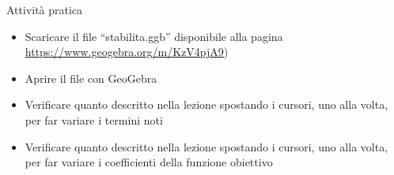 \documentclass{beamer}
\begin{document}
\generatitolo

\begin{frame}{Attivit\`a pratica}

    \begin{itemize}
    
     \item Scaricare il file ``stabilita.ggb''
     disponibile alla pagina
     \url{https://www.geogebra.org/m/KzV4pjA9})
     
     \item Aprire il file con \alert{GeoGebra}
     
     \item Verificare quanto descritto nella lezione spostando i cursori, uno alla volta, per far variare i termini noti
     
     \item Verificare quanto descritto nella lezione spostando i cursori, uno alla volta, per far variare i coefficienti della funzione obiettivo    
    \end{itemize}
\end{frame}
\end{document}
